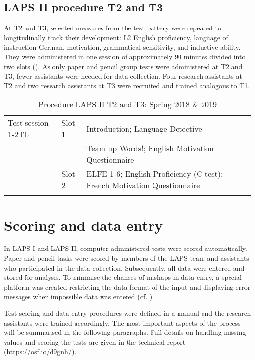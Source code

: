\documentclass[output=paper]{langsci/langscibook}
\begin{document}
 \subsection{LAPS II procedure T2 and T3}


At T2 and T3, selected measures from the test battery were repeated to longitudinally track their development: L2 English proficiency, language of instruction German, motivation, grammatical sensitivity, and inductive ability. They were administered in one session of approximately 90 minutes divided into two slots (). As only paper and pencil group tests were administered at T2 and T3, fewer assistants were needed for data collection. Four research assistants at T2 and two research assistants at T3 were recruited and trained analogous to T1.


\begin{table}
\begin{tabularx}{\textwidth}{llQ}
\lsptoprule
Test session 1-2TL & Slot 1 & Introduction; Language Detective\\
                   &  & Team up Words!; English Motivation Questionnaire\\
                   & Slot 2 & ELFE 1-6; English Proficiency (C-test); French Motivation Questionnaire\\
\lspbottomrule
\end{tabularx}
\caption{Procedure LAPS II T2 and T3: Spring 2018 \& 2019\label{tab:02:7}}
\end{table}

\section{Scoring and data entry}

In LAPS I and LAPS II, computer-administered tests were scored automatically. Paper and pencil tasks were scored by members of the LAPS team and assistants who participated in the data collection. Subsequently, all data were entered and stored for analysis. To minimise the chances of mishaps in data entry, a special platform was created restricting the data format of the input and displaying error messages when impossible data was entered (cf. \citealt{Vanhove2018}). 

Test scoring and data entry procedures were defined in a manual and the research assistants were trained accordingly. The most important aspects of the process will be summarised in the following paragraphs. Full details on handling missing values and scoring the tests are given in the technical report (\url{https://osf.io/d9gnh/}).
\end{document}
